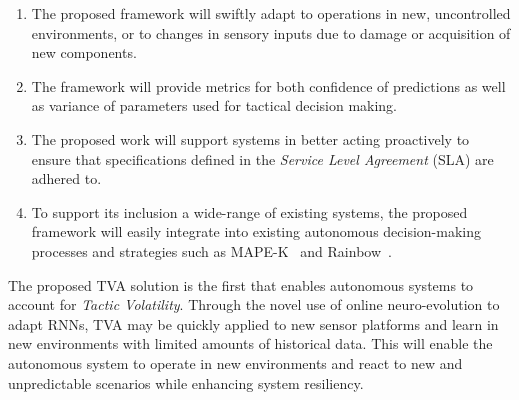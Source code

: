 \begin{enumerate}[noitemsep]



    \item The proposed framework will swiftly adapt to operations in new, uncontrolled environments, or to changes in sensory inputs due to damage or acquisition of new components.
    
    \item The framework will provide metrics for both confidence of predictions as well as variance of parameters used for tactical decision making.
    
    


    
    
    


	\item The proposed work will support systems in better acting proactively to ensure that specifications defined in the \emph{Service Level Agreement} (SLA) are adhered to.

	\item To support its inclusion a wide-range of existing systems, the proposed framework will easily integrate into existing autonomous decision-making processes and strategies such as MAPE-K~\cite{kephart2003vision} and Rainbow~\cite{garlan2004rainbow}.

\end{enumerate}

The proposed TVA solution is the first that enables autonomous systems to account for \emph{Tactic Volatility}. Through the novel use of online neuro-evolution to adapt RNNs, TVA may be quickly applied to new sensor platforms and learn in new environments with limited amounts of historical data. This will enable the autonomous system to operate in new environments and react to new and unpredictable scenarios while enhancing system resiliency.

